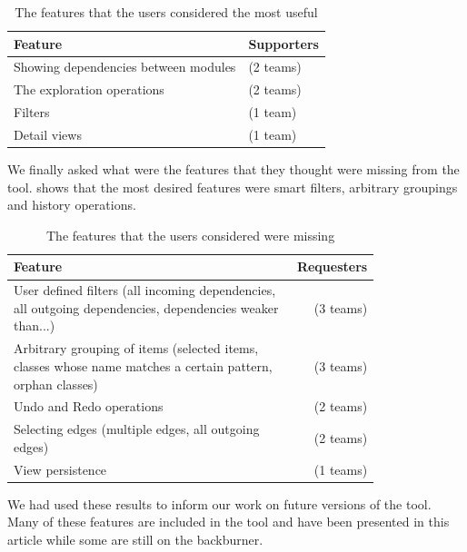 \documentclass[preprint,12pt]{elsarticle}
\begin{document}
\begin{table}[ht]
\begin{center}
\begin{tabular}{l l}
\footnotesize {Feature} &\footnotesize{ Supporters} \\
\hline
\footnotesize {Showing dependencies between modules} & \footnotesize{(2 teams)} \\
\footnotesize {The exploration operations} &\footnotesize{(2 teams)} \\
\footnotesize {Filters} &\footnotesize{(1 team)} \\
\footnotesize {Detail views} &\footnotesize{(1 team)} \\
\hline
\end{tabular}
\caption{The features that the users considered the most useful}
\label{tab:useful}
\end{center}
\end{table}

We finally asked what were the features that they thought were missing from the tool.  shows that the most desired features were smart filters, arbitrary groupings and history operations.

\begin{table}[ht]
\begin{center}
\begin{tabular}{p{0.8\linewidth} r}
\footnotesize {Feature} &\footnotesize{ Requesters} \\
\hline
\footnotesize {User defined filters (all incoming dependencies, all outgoing dependencies, dependencies weaker than...)} &\footnotesize{ (3 teams)} \\
\footnotesize {Arbitrary grouping of items (selected items, classes whose name matches a certain pattern, orphan classes)} &\footnotesize{ (3 teams)} \\
\footnotesize {Undo and Redo operations} &\footnotesize{ (2 teams)} \\
\footnotesize {Selecting edges (multiple edges, all outgoing edges)} &\footnotesize{ (2 teams)} \\
\footnotesize {View persistence} &\footnotesize{ (1 teams)} \\
\hline

\end{tabular}
\caption{The features that the users considered were missing}
\label{tab:missing}
\end{center}
\end{table}

We had used these results to inform our work on future versions of the tool. Many of these features are included in the tool and have been presented in this article while some are still on the backburner. 
\end{document}
